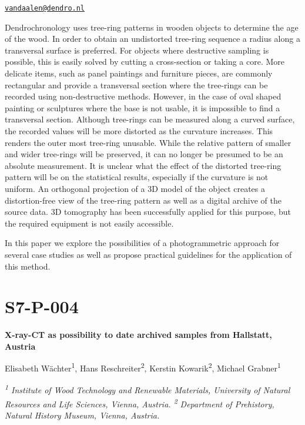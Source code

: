 \documentclass[
]{book}
\begin{document}
\href{mailto:vandaalen@dendro.nl}{\nolinkurl{vandaalen@dendro.nl}}

Dendrochronology uses tree-ring patterns in wooden objects to determine the age of the wood. In order to obtain an undistorted tree-ring sequence a radius along a transversal surface is preferred. For objects where destructive sampling is possible, this is easily solved by cutting a cross-section or taking a core. More delicate items, such as panel paintings and furniture pieces, are commonly rectangular and provide a transversal section where the tree-rings can be recorded using non-destructive methods. However, in the case of oval shaped painting or sculptures where the base is not usable, it is impossible to find a transversal section. Although tree-rings can be measured along a curved surface, the recorded values will be more distorted as the curvature increases. This renders the outer most tree-ring unusable. While the relative pattern of smaller and wider tree-rings will be preserved, it can no longer be presumed to be an absolute measurement. It is unclear what the effect of the distorted tree-ring pattern will be on the statistical results, especially if the curvature is not uniform. An orthogonal projection of a 3D model of the object creates a distortion-free view of the tree-ring pattern as well as a digital archive of the source data. 3D tomography has been successfully applied for this purpose, but the required equipment is not easily accessible.

In this paper we explore the possibilities of a photogrammetric approach for several case studies as well as propose practical guidelines for the application of this method.

\hypertarget{s7-p-004}{%
\section*{S7-P-004}\label{s7-p-004}}

\textbf{X-ray-CT as possibility to date archived samples from Hallstatt, Austria}

Elisabeth Wächter\textsuperscript{1}, Hans Reschreiter\textsuperscript{2}, Kerstin Kowarik\textsuperscript{2}, Michael Grabner\textsuperscript{1}

\emph{\textsuperscript{1} Institute of Wood Technology and Renewable Materials, University of Natural Resources and Life Sciences, Vienna, Austria. \textsuperscript{2} Department of Prehistory, Natural History Museum, Vienna, Austria.}
\end{document}

